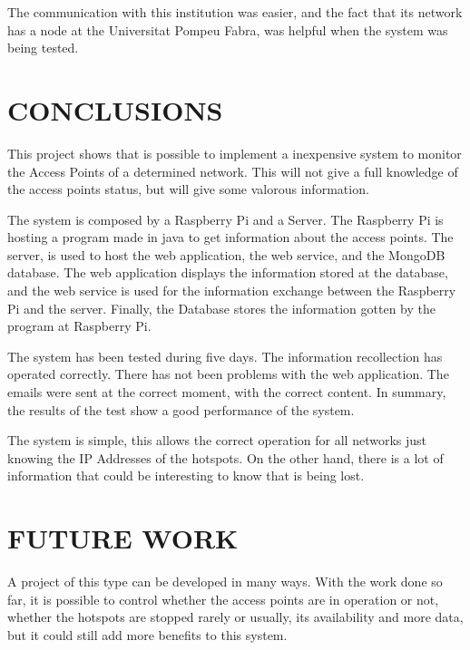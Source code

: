 \documentclass[12pt, a4paper,twoside]{tesi_upf}
\begin{document}
    The communication with this institution was easier, and the fact that its network has a node at the Universitat Pompeu Fabra, was helpful when the system was being tested. 
    
    
\chapter{CONCLUSIONS}
\label{Chapter6}

This project shows that is possible to implement a inexpensive system to monitor the Access Points of a determined network. This will not give a full knowledge of the access points status, but will give some valorous information.

The system is composed by a Raspberry Pi and a Server. The Raspberry Pi is hosting a program made in java to get information about the access points. The server, is used to host the web application, the web service, and the MongoDB database. The web application displays the information stored at the database, and the web service is used for the information exchange between the Raspberry Pi and the server. Finally, the Database stores the information gotten by the program at Raspberry Pi.

The system has been tested during five days. The information recollection has operated correctly. There has not been problems with the web application. The emails were sent at the correct moment, with the correct content. In summary, the results of the test show a good performance of the system.

The system is simple, this allows the correct operation for all networks just knowing the IP Addresses of the hotspots. On the other hand, there is a lot of information that could be interesting to know that is being lost.






\chapter{FUTURE WORK}
\label{Chapter7}

A project of this type can be developed in many ways. With the work done so far, it is possible to control whether the access points are in operation or not, whether the hotspots are stopped rarely or usually, its availability and more data, but it could still add more benefits to this system.
\end{document}
